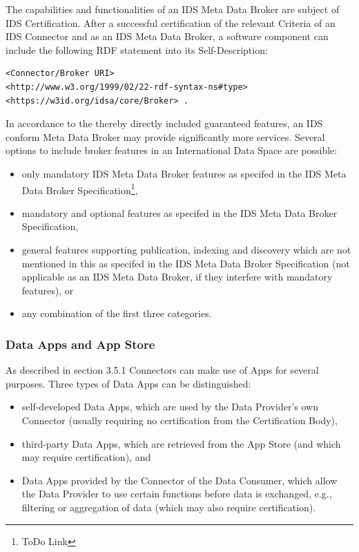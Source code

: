 The capabilities and functionalities of an IDS Meta Data Broker are subject of IDS Certification. After a successful certification of the relevant Criteria of an IDS Connector and as an IDS Meta Data Broker, a software component can include the following RDF statement into its Self-Description:
 
\begin{verbatim}
<Connector/Broker URI>
<http://www.w3.org/1999/02/22-rdf-syntax-ns#type>
<https://w3id.org/idsa/core/Broker> .
\end{verbatim}

In accordance to the thereby directly included guaranteed features, an IDS conform Meta Data Broker may provide significantly more services. Several options to include broker features in an International Data Space are possible: 
\begin{itemize}
	\item only mandatory IDS Meta Data Broker features as specifed in the IDS Meta Data Broker Specification\footnote{ToDo Link},
	\item mandatory and optional features as specifed in the IDS Meta Data Broker Specification,
	\item general features supporting publication, indexing and discovery which are not mentioned in this as specifed in the IDS Meta Data Broker Specification (not applicable as an IDS Meta Data Broker, if they interfere with mandatory features), or
	\item any combination of the first three categories.
\end{itemize}


\subsubsection{Data Apps and App Store}
As described in section 3.5.1 Connectors can make use of Apps for several purposes. Three types of Data Apps can be distinguished:

\begin{itemize}
	\item self-developed Data Apps, which are used by the Data Provider's own Connector (usually requiring no certification from the Certification Body),

	\item third-party Data Apps, which are retrieved from the App Store (and which may require certification), and

	\item Data Apps provided by the Connector of the Data Consumer, which allow the Data Provider to use certain functions before data is exchanged, e.g., filtering or aggregation of data (which may also require certification).
\end{itemize}

